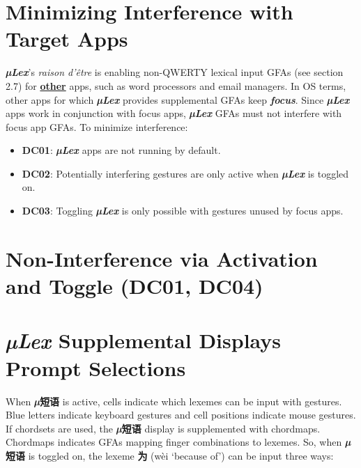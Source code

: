 \section{Minimizing Interference with Target
Apps}\label{minimizing-interference-with-target-apps}

\emph{\textbf{µLex}}'s \emph{raison d'être} is enabling non-QWERTY
lexical input GFAs (see section 2.7) for \textbf{\uline{other}} apps,
such as word processors and email managers. In OS terms, other apps for
which \emph{\textbf{µLex}} provides supplemental GFAs keep
\emph{\textbf{focus}}. Since \emph{\textbf{µLex}} apps work in
conjunction with focus apps, \emph{\textbf{µLex}} GFAs must not
interfere with focus app GFAs. To minimize interference:

\begin{itemize}
\item
  \textbf{DC01}: \emph{\textbf{µLex}} apps are not running by default.
\item
  \textbf{DC02}: Potentially interfering gestures are only active when
  \emph{\textbf{µLex}} is toggled on.
\item
  \textbf{DC03}: Toggling \emph{\textbf{µLex}} is only possible with
  gestures unused by focus apps.
\end{itemize}

\section{\texorpdfstring{ Non-Interference via Activation and
Toggle (DC01,
DC04)}{ Non-Interference via Activation and Toggle (DC01, DC04)}}\label{non-interference-via-activation-and-toggle-dc01-dc04}

\section{\texorpdfstring{\emph{\textbf{µLex}} Supplemental Displays
Prompt
Selections}{µLex Supplemental Displays Prompt Selections}}\label{uxb5lex-supplemental-displays-prompt-selections}

When \textbf{\emph{µ}短语} is active, cells indicate which lexemes can
be input with gestures. Blue letters indicate keyboard gestures and cell
positions indicate mouse gestures. If chordsets are used, the
\textbf{\emph{µ}短语} display is supplemented with chordmaps. Chordmaps
indicates GFAs mapping finger combinations to lexemes. So, when
\textbf{\emph{µ}短语} is toggled on, the lexeme \textbf{为} (wèi
`because of') can be input three ways:

